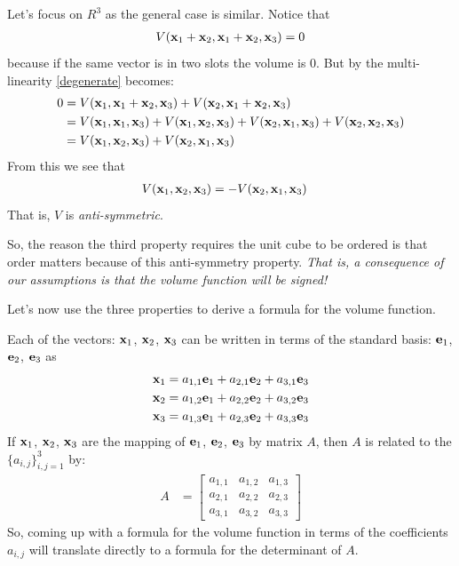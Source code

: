 \documentclass{article}
\begin{document}
Let's focus on $R^3$ as the general case is similar. Notice that
\begin{align}
  V({\bf x}_1 + {\bf x}_2, {\bf x}_1 + {\bf x}_2, {\bf x}_3) = 0 \label{degenerate}
\end{align}
because if the same vector is in two slots the volume is $0$.
But by the multi-linearity \eqref{degenerate} becomes:
\begin{align}
  0 &= V({\bf x}_1, {\bf x}_1 + {\bf x}_2, {\bf x}_3)
      +  V({\bf x}_2, {\bf x}_1 + {\bf x}_2, {\bf x}_3) \nonumber \\
    &= V({\bf x}_1, {\bf x}_1 , {\bf x}_3)
          + V({\bf x}_1, {\bf x}_2, {\bf x}_3)
          +  V({\bf x}_2, {\bf x}_1, {\bf x}_3)
          + V({\bf x}_2, {\bf x}_2, {\bf x}_3) \nonumber \\
  &= V({\bf x}_1, {\bf x}_2, {\bf x}_3) + V({\bf x}_2, {\bf x}_1, {\bf x}_3)
\end{align}
From this we see that 
\begin{align}
  V({\bf x}_1, {\bf x}_2, {\bf x}_3)  &= - V({\bf x}_2, {\bf x}_1, {\bf x}_3)
\end{align}
That is, $V$ is {\em anti-symmetric\/}.


So, the reason the third property requires the unit cube to be ordered
is that order matters because of this anti-symmetry property. {\em That is,
a consequence of our assumptions is that the volume function will be
signed!\/}

Let's now use the three properties to derive a formula for the volume
function.

Each of the vectors: ${\bf x}_1$, ${\bf x}_2$, ${\bf x}_3$ can be written in
terms of the standard basis: ${\bf e}_1$, ${\bf e}_2$, ${\bf e}_3$ as
\begin{align*}
  {\bf x}_1 &= a_{1,1} {\bf e}_1 + a_{2,1} {\bf e}_2 + a_{3,1} {\bf e}_3 \\
  {\bf x}_2 &= a_{1,2} {\bf e}_1 + a_{2,2} {\bf e}_2 + a_{3,2} {\bf e}_3 \\
  {\bf x}_3 &= a_{1,3} {\bf e}_1 + a_{2,3} {\bf e}_2 + a_{3,3} {\bf e}_3
\end{align*}
If ${\bf x}_1$, ${\bf x}_2$, ${\bf x}_3$ are the mapping of
${\bf e}_1$, ${\bf e}_2$, ${\bf e}_3$ by matrix $A$, then $A$ is related to the
$\{a_{i,j}\}_{i,j=1}^3$ by:
\begin{align}
  A &= \left[ \begin{array}{ccc}
                   a_{1,1} & a_{1, 2} & a_{1,3} \\
                   a_{2,1} & a_{2, 2} & a_{2,3} \\
                   a_{3,1} & a_{3, 2} & a_{3,3}
                 \end{array} \right]
\end{align}
So, coming up with a formula for the volume function in terms of the
coefficients $a_{i,j}$ will
translate directly to a formula for the determinant of $A$.
\end{document}
